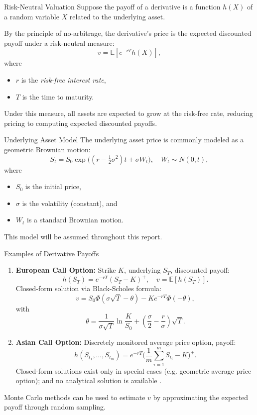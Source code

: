 \documentclass[9pt]{beamer}
\begin{document}
\begin{frame}{Risk-Neutral Valuation}
Suppose the payoff of a derivative is a function $h(X)$ of a random variable $X$ related to the underlying asset. 

By the principle of no-arbitrage\cite{merton1973rational, black1973pricing}, the derivative's price is the expected discounted payoff under a risk-neutral measure:
\[
v = \mathbb{E}[e^{-r T} h(X)],
\]
where
\begin{itemize}
    \item $r$ is the \textit{risk-free interest rate}, 
    \item $T$ is the time to maturity.
\end{itemize}

Under this measure, all assets are expected to grow at the risk-free rate, reducing pricing to computing expected discounted payoffs.
\end{frame}

\begin{frame}{Underlying Asset Model}
The underlying asset price is commonly modeled as a geometric Brownian motion:
\[
S_t = S_0 \exp \Big( (r - \tfrac{1}{2} \sigma^2) t + \sigma W_t \Big), \quad W_t \sim N(0,t),
\]
where
\begin{itemize}
    \item $S_0$ is the initial price,
    \item $\sigma$ is the volatility (constant), and
    \item $W_t$ is a standard Brownian motion.
\end{itemize}

This model will be assumed throughout this report.
\end{frame}

\begin{frame}{Examples of Derivative Payoffs}
\begin{enumerate}
    \item \textbf{European Call Option:} Strike $K$, underlying $S_T$, discounted payoff:
    \[
    h(S_T) = e^{-r T} (S_T - K)^+, \quad v = \mathbb{E}[h(S_T)].
    \]
    Closed-form solution via Black-Scholes formula\cite{black1973pricing}:
    \[
    v = S_0 \Phi(\sigma\sqrt{T} - \theta) - K e^{-r T} \Phi(-\theta),
    \]
    with $$\theta = \frac{1}{\sigma \sqrt{T}} \ln \frac{K}{S_0} + (\frac{\sigma}{2} - \frac{r}{\sigma}) \sqrt{T}.$$
    
    \item \textbf{Asian Call Option:} Discretely monitored average price option, payoff:
    \[
    h(S_{t_1},\dots,S_{t_m}) = e^{-r T} \Big(\frac{1}{m} \sum_{i=1}^{m} S_{t_i} - K\Big)^+.
    \]
    Closed-form solutions exist only in special cases (e.g. geometric average price option); and no analytical solution is available \cite{kemna1990pricing}.
\end{enumerate}

\smallskip
Monte Carlo methods can be used to estimate $v$ by approximating the expected payoff through random sampling.
\end{frame}
\end{document}
